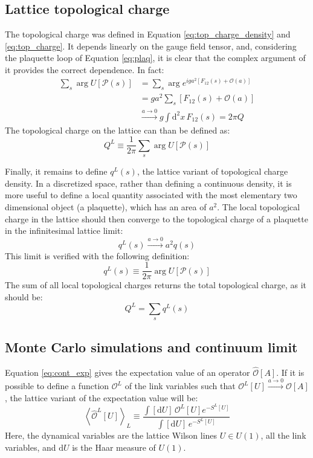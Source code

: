 \subsection*{Lattice topological charge}

The topological charge was defined in Equation \eqref{eq:top_charge_density} and \eqref{eq:top_charge}.
It depends linearly on the gauge field tensor, and,
considering the plaquette loop of Equation \eqref{eq:plaq},
it is clear that the complex argument of it provides the correct dependence.
In fact:
\[
    \begin{aligned}
        \sum_s\arg U[\mathcal P(s)] &= \sum_s\arg e^{iga^2\left[F_{12}(s) + \mathcal O\left(a\right)\right]} \\
                                        &= ga^2\sum_s\left[F_{12}(s) + \mathcal O\left(a\right)\right] \\
                                        &\xrightarrow{a\to0} g\int\mathrm d^2x\,F_{12}(s) = 2\pi Q
    \end{aligned}
\]
The topological charge on the lattice can than be defined as:
\begin{equation}\label{eq:lat_top_charge}
    Q^L \equiv \frac{1}{2\pi}\sum_s\arg U[\mathcal P(s)]
\end{equation}

Finally, it remains to define $q^L(s)$, the lattice variant of topological charge density.
In a discretized space, rather than defining a continuous density,
it is more useful to define a local quantity associated with the most elementary two dimensional object (\ie a plaquette),
which has an area of $a^2$.
The local topological charge in the lattice should then converge to the topological charge of a plaquette in the infinitesimal lattice limit:
\[
    q^L(s) \xrightarrow{a\to0} a^2q(s)
\]
This limit is verified with the following definition:
\begin{equation}\label{eq:lat_loc_top_charge}
    q^L(s) \equiv \frac{1}{2\pi}\arg U[\mathcal P(s)]
\end{equation}
The sum of all local topological charges returns the total topological charge, as it should be:
\[
    Q^L = \sum_sq^L(s)
\]

\subsection*{Monte Carlo simulations and continuum limit}

Equation \eqref{eq:cont_exp} gives the expectation value of an operator $\hat{\mathcal O}[A]$.
If it is possible to define a function $\mathcal O^L$ of the link variables such that $\mathcal O^L[U] \xrightarrow{a\to0} \mathcal O[A]$,
the lattice variant of the expectation value will be:
\begin{equation}\label{eq:lat_exp}
    \left<\hat{\mathcal O}^L[U]\right>_L \equiv \frac{\int[\mathrm dU]\, \mathcal O^L[U] e^{-S^L[U]}}{\int[\mathrm dU]\,e^{-S^L[U]}}
\end{equation}
Here, the dynamical variables are the lattice Wilson lines $U \in U(1)$, \ie all the link variables, and $\mathrm dU$ is the Haar measure of $U(1)$.

